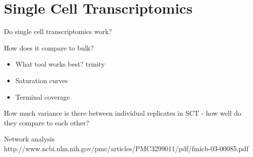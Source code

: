 \graphicspath{{chapters/5.Chapter_3/figures}}

\chapter{Single Cell Transcriptomics}

Do single cell transcriptomics work?

How does it compare to bulk? 
\begin{itemize}
    \item What tool works best? trinity
    \item Saturation curves
    \item Terminal coverage
\end{itemize}

How much variance is there between individual replicates in SCT - how well do they compare to each other?



Network analysis
http://www.ncbi.nlm.nih.gov/pmc/articles/PMC3299011/pdf/fmicb-03-00085.pdf


